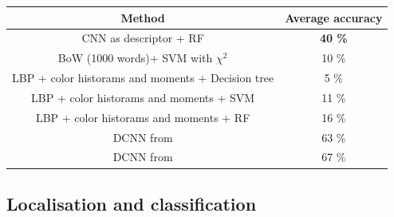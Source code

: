 \documentclass[aspectratio=169]{beamer}
\newenvironment{myframe}[1][t]{\begin{frame}[#1]{\secname}{\subsecname}}{\end{frame}}
\begin{document}
    \begin{myframe}
          \begin{center}
              \renewcommand{\arraystretch}{1.3} %
              \begin{tabulary}{\textwidth}{|| c | C||}
                  \hline
                  Method & Average accuracy \\
                  \hline\hline
                  CNN as descriptor + RF & \textbf{40 \%} \\ 
                  \hline
                  BoW (1000 words)+ SVM with $\chi^2$ & 10 \% \\ %
                  \hline
                  LBP + color historams and moments + Decision tree & 5 \% \\ 
                  \hline
                  LBP + color historams and moments + SVM & 11 \% \\ %
                  \hline
                  LBP + color historams and moments + RF & 16 \% \\ %
                  \hline
                  \hline
                  DCNN from \cite{Bolanos2016} & 63 \%\\
                  \hline 
                  DCNN from \cite{Yanai2015} & 67 \%\\
                  \hline 
                \end{tabulary}
            \end{center}
    \end{myframe}
    
    \subsection{Localisation and classification}
    
\end{document}

